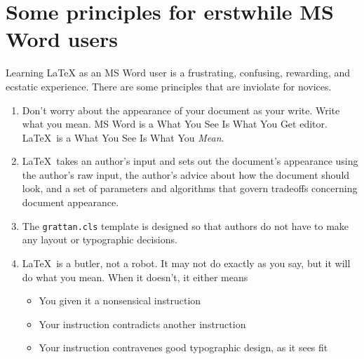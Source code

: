 \documentclass[a4paper,11pt]{scrartcl}\usepackage[]{graphicx}\usepackage[]{color}
\begin{document}
 \section{Some principles for erstwhile MS Word users}
 Learning \LaTeX{} as an MS Word user is a frustrating, confusing, rewarding, and ecstatic experience.  There are some principles that are inviolate for novices.
 \begin{enumerate}
  \item Don't worry about the appearance of your document as your write. Write what you mean. MS Word is a What You See Is What You Get editor. \LaTeX\ is a What You See Is What You \emph{Mean}.
  \item \LaTeX\ takes an author's input and sets out the document's appearance using the author's raw input, the author's advice about how the document should look, and a set of parameters and algorithms that govern tradeoffs concerning document appearance. 
  \item The \verb=grattan.cls= template is designed so that authors do not have to make any layout or typographic decisions.
  \item \LaTeX\ is a butler, not a robot. It may not do exactly as you say, but it will do what you mean. When it doesn't, it either means 
  \begin{itemize}
   \item You given it a nonsensical instruction
   \item Your instruction contradicts another instruction
   \item Your instruction contravenes good typographic design, as it sees fit
  \end{itemize}


\end{enumerate}
\end{document}
